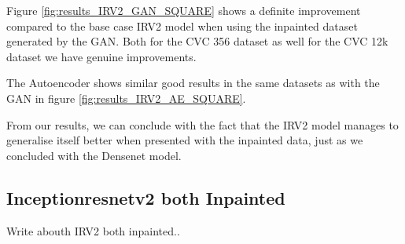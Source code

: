 Figure \ref{fig:results_IRV2_GAN_SQUARE} shows a definite improvement compared to the base case IRV2 model when using the inpainted dataset generated by the GAN. Both for the CVC 356 dataset as well for the CVC 12k dataset we have genuine improvements.

The Autoencoder shows similar good results in the same datasets as with the GAN in figure \ref{fig:results_IRV2_AE_SQUARE}. 

From our results, we can conclude with the fact that the IRV2 model manages to generalise itself better when presented with the inpainted data, just as we concluded with the Densenet model.

























\FloatBarrier
\subsection{Inceptionresnetv2 both Inpainted}
Write abouth IRV2 both inpainted..


